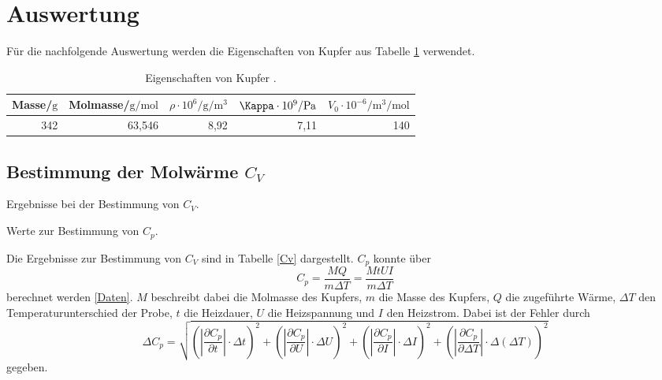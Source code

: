 \newpage
\section{Auswertung} %
\label{sec:auswertung}

Für die nachfolgende Auswertung werden die Eigenschaften von Kupfer aus Tabelle \ref{Eigenschaften} verwendet.

\begin{table}[!h]
	\centering
	\caption[]{Eigenschaften von Kupfer \cite{kupfer1}\cite{kupfer2}.}
	\begin{tabular}{rrrrr}
		\toprule
		Masse/$\si{\gram}$ & Molmasse/$\si{\gram\per\mol}$ & $\rho \cdot 10^6/\si{\gram\per\meter^3}$ & $\Kappa \cdot 10^9/\si{\pascal}$ & $V_0 \cdot 10^{-6}/\si{\meter^3\per\mol}$\\
		\midrule
		342 & 63,546 & 8,92 & 7,11 & 140\\
		\bottomrule
	\end{tabular}
	\label{Eigenschaften}
\end{table}

\FloatBarrier
\subsection{Bestimmung der Molwärme $C_V$} %
\label{sub:bestimmung_von_c__mathrm}

\begin{table}[!h]
	\caption[]{Ergebnisse bei der Bestimmung von $C_V$.}
	\centering
	
	\label{Cv}
\end{table}

\begin{table}[!h]
	\centering
	\caption[]{Werte zur Bestimmung von $C_p$.}
	
	\label{Daten}
\end{table}

Die Ergebnisse zur Bestimmung von $C_V$ sind in Tabelle \ref{Cv} dargestellt.
$C_p$ konnte über
\begin{equation*}
	C_p = \frac{M Q}{m \Delta T} = \frac{M t U I}{m \Delta T}
\end{equation*}
berechnet werden \ref{Daten}.
$M$ beschreibt dabei die Molmasse des Kupfers, $m$ die Masse des Kupfers, $Q$ die zugeführte Wärme, $\Delta T$ den Temperaturunterschied der Probe, $t$ die Heizdauer, $U$ die Heizspannung und $I$ den Heizstrom.
Dabei ist der Fehler durch
\begin{equation*}
	\Delta C_p = \sqrt{\left(|\frac{\partial C_p}{\partial t}|\cdot \Delta t \right)^2 + \left(|\frac{\partial C_p}{\partial U}|\cdot \Delta U \right)^2 + \left(|\frac{\partial C_p}{\partial I}|\cdot \Delta I \right)^2 + \left(|\frac{\partial C_p}{\partial \Delta T}|\cdot \Delta (\Delta T) \right)^2}
\end{equation*}
gegeben.

